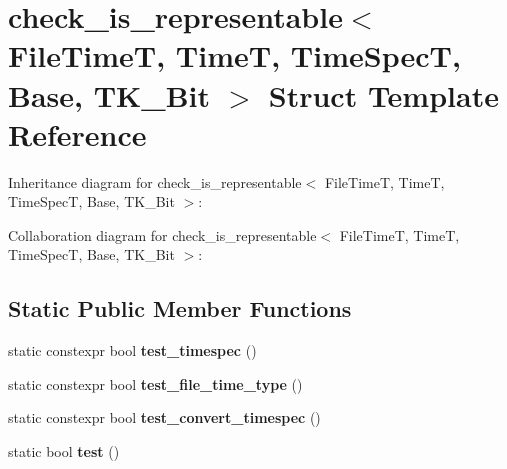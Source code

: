 \hypertarget{structcheck__is__representable_3_01_file_time_t_00_01_time_t_00_01_time_spec_t_00_01_base_00_01_t_k__64_bit_01_4}{}\section{check\+\_\+is\+\_\+representable$<$ File\+TimeT, TimeT, Time\+SpecT, Base, T\+K\+\_\+Bit $>$ Struct Template Reference}
\label{structcheck__is__representable_3_01_file_time_t_00_01_time_t_00_01_time_spec_t_00_01_base_00_01_t_k__64_bit_01_4}


Inheritance diagram for check\+\_\+is\+\_\+representable$<$ File\+TimeT, TimeT, Time\+SpecT, Base, T\+K\+\_\+Bit $>$\+:


Collaboration diagram for check\+\_\+is\+\_\+representable$<$ File\+TimeT, TimeT, Time\+SpecT, Base, T\+K\+\_\+Bit $>$\+:
\subsection*{Static Public Member Functions}
\begin{DoxyCompactItemize}
\item 
\mbox{\label{structcheck__is__representable_3_01_file_time_t_00_01_time_t_00_01_time_spec_t_00_01_base_00_01_t_k__64_bit_01_4_a04ed87c5d7b6e4172b642fb25ef1806a}} 
static constexpr bool {\bfseries test\+\_\+timespec} ()
\item 
\mbox{\label{structcheck__is__representable_3_01_file_time_t_00_01_time_t_00_01_time_spec_t_00_01_base_00_01_t_k__64_bit_01_4_ac5fdff75096709a5123c7facccbc3acf}} 
static constexpr bool {\bfseries test\+\_\+file\+\_\+time\+\_\+type} ()
\item 
\mbox{\label{structcheck__is__representable_3_01_file_time_t_00_01_time_t_00_01_time_spec_t_00_01_base_00_01_t_k__64_bit_01_4_a0848bf6a488d3711578295bfdc204ae1}} 
static constexpr bool {\bfseries test\+\_\+convert\+\_\+timespec} ()
\item 
\mbox{\label{structcheck__is__representable_3_01_file_time_t_00_01_time_t_00_01_time_spec_t_00_01_base_00_01_t_k__64_bit_01_4_af4b0738156fc31232c1f56587e78a791}} 
static bool {\bfseries test} ()
\end{DoxyCompactItemize}
